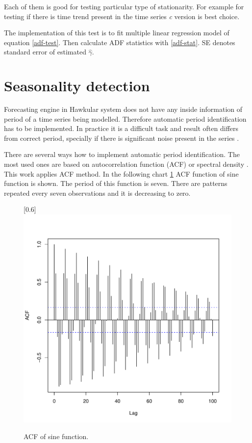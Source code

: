     Each of them is good for testing particular type of stationarity. For example for testing if there is time trend
    present in the time series \emph{c} version is best choice.

    The implementation of this test is to fit multiple linear regression model of equation \ref{adf-test}. Then
    calculate ADF statistics with \ref{adf-stat}. SE denotes standard error of estimated $\hat{\gamma}$.

    \section{Seasonality detection}
    Forecasting engine in Hawkular system does not have any inside information of period of a time series being
    modelled. Therefore automatic period identification has to be implemented. In practice it is a difficult task and
    result often differs from correct period, specially if there is significant noise present in the series
    \cite{period-meteo}.

    There are several ways how to implement automatic period identification. The most used ones are based on
    autocorrelation function (ACF) or spectral density \cite{period-hydman}. This work applies ACF method.
    In the following chart \ref{img:period-acf} ACF function of sine function is shown. The period of this
    function is seven. There are patterns repeated every seven observations and it is decreasing to zero.

    \begin{figure}[H]
        \begin{center}
            \scalebox{0.73}[0.6]{\includegraphics{img/acf-sine.pdf}}
            \caption{ACF of sine function.}
            \label{img:period-acf}
        \end{center}
    \end{figure}

